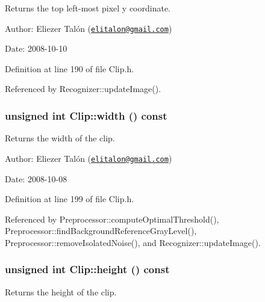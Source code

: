 Returns the top left-most pixel y coordinate. 

\begin{Desc}
\item[Author:]Eliezer Talón (\href{mailto:elitalon@gmail.com}{\tt elitalon@gmail.com}) \end{Desc}
\begin{Desc}
\item[Date:]2008-10-10 \end{Desc}


Definition at line 190 of file Clip.h.

Referenced by Recognizer::updateImage().\hypertarget{class_clip_d3e816599913e4051e5d50fae17ecd76}{
\subsubsection[width]{\setlength{\rightskip}{0pt plus 5cm}unsigned int Clip::width () const}}
\label{class_clip_d3e816599913e4051e5d50fae17ecd76}


Returns the width of the clip. 

\begin{Desc}
\item[Author:]Eliezer Talón (\href{mailto:elitalon@gmail.com}{\tt elitalon@gmail.com}) \end{Desc}
\begin{Desc}
\item[Date:]2008-10-08 \end{Desc}


Definition at line 199 of file Clip.h.

Referenced by Preprocessor::computeOptimalThreshold(), Preprocessor::findBackgroundReferenceGrayLevel(), Preprocessor::removeIsolatedNoise(), and Recognizer::updateImage().\hypertarget{class_clip_393710a6b136f400dd5c900f8831e1a8}{
\subsubsection[height]{\setlength{\rightskip}{0pt plus 5cm}unsigned int Clip::height () const}}
\label{class_clip_393710a6b136f400dd5c900f8831e1a8}


Returns the height of the clip. 

